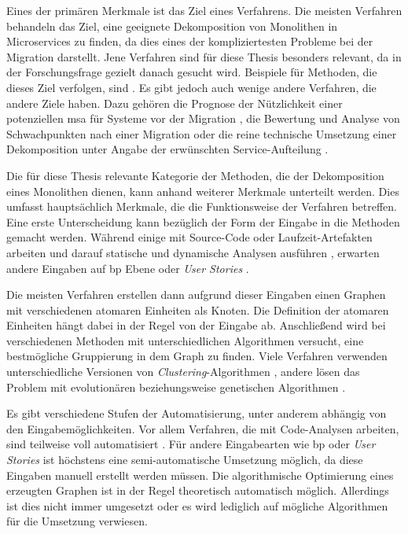 Eines der primären Merkmale ist das Ziel eines Verfahrens.
Die meisten Verfahren behandeln das Ziel, eine geeignete Dekomposition von Monolithen in Microservices zu finden, da dies eines der kompliziertesten Probleme bei der Migration darstellt.
Jene Verfahren sind für diese Thesis besonders relevant, da in der Forschungsfrage gezielt danach gesucht wird.
Beispiele für Methoden, die dieses Ziel verfolgen, sind \cite{arh-result-no-filter-3,arh-result-no-filter-2,arh-result-no-filter-5,arh-result-important-filter-4,arh-result-important-filter-7}.
Es gibt jedoch auch wenige andere Verfahren, die andere Ziele haben.
Dazu gehören die Prognose der Nützlichkeit einer potenziellen \gls{msa} für Systeme vor der Migration \cite{muP-a-dev-framework}, die Bewertung und Analyse von Schwachpunkten nach einer Migration \cite{https://doi.org/10.1002/spe.2974} oder die reine technische Umsetzung einer Dekomposition unter Angabe der erwünschten Service-Aufteilung \cite{arh-result-no-filter-4}.

Die für diese Thesis relevante Kategorie der Methoden, die der Dekomposition eines Monolithen dienen, kann anhand weiterer Merkmale unterteilt werden.
Dies umfasst hauptsächlich Merkmale, die die Funktionsweise der Verfahren betreffen.
Eine erste Unterscheidung kann bezüglich der Form der Eingabe in die Methoden gemacht werden.
Während einige mit Source-Code oder Laufzeit-Artefakten arbeiten und darauf statische und dynamische Analysen ausführen \cite{arh-result-no-filter-5}, erwarten andere Eingaben auf \acrlong{bp} Ebene \cite{arh-result-no-filter-3} oder \emph{User Stories} \cite{arh-result-no-filter-2}.

Die meisten Verfahren erstellen dann aufgrund dieser Eingaben einen Graphen mit verschiedenen atomaren Einheiten als Knoten.
Die Definition der atomaren Einheiten hängt dabei in der Regel von der Eingabe ab.
Anschließend wird bei verschiedenen Methoden mit unterschiedlichen Algorithmen versucht, eine bestmögliche Gruppierung in dem Graph zu finden.
Viele Verfahren verwenden unterschiedliche Versionen von \emph{Clustering}-Algorithmen \cite{arh-result-no-filter-3,arh-result-no-filter-5,arh-result-important-filter-4}, andere lösen das Problem mit evolutionären beziehungsweise genetischen Algorithmen \cite{arh-result-no-filter-2,arh-result-important-filter-7}.

Es gibt verschiedene Stufen der Automatisierung, unter anderem abhängig von den Eingabemöglichkeiten.
Vor allem Verfahren, die mit Code-Analysen arbeiten, sind teilweise voll automatisiert \cite{Fil2023}.
Für andere Eingabearten wie \acrfull{bp} oder \emph{User Stories} ist höchstens eine semi-automatische Umsetzung möglich, da diese Eingaben manuell erstellt werden müssen.
Die algorithmische Optimierung eines erzeugten Graphen ist in der Regel theoretisch automatisch möglich.
Allerdings ist dies nicht immer umgesetzt oder es wird lediglich auf mögliche Algorithmen für die Umsetzung verwiesen.


